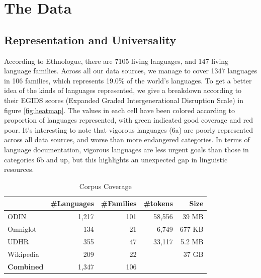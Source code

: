 \section{The Data}\label{sec:data}

\subsection{Representation and Universality} \label{sec:stats}

According to Ethnologue, there are 7105 living languages, and 147 living language families. Across all our data sources, we manage to cover 1347 languages in 106 families, which represents 19.0\% of the world's languages. To get a better idea of the kinds of languages represented, we give a breakdown according to their EGIDS scores (Expanded Graded Intergenerational Disruption Scale) \cite{lewis2010assessing} in figure \ref{fig:heatmap}. The values in each cell have been colored according to proportion of languages represented, with green indicated good coverage and red poor. It's interesting to note that vigorous languages (6a) are poorly represented across all data sources, and worse than more endangered categories. In terms of language documentation, vigorous languages are less urgent goals than those in categories 6b and up, but this highlights an unexpected gap in linguistic resources.


\begin{table}[h!]
\small
\centering
    \begin{tabular}{l|rr|rr}
    ~         				& \#Languages & \#Families 	&\#tokens		& Size	\\ \hline
    ODIN      				& 1,217      & 101       		& 58,556		& 39 MB		\\
    Omniglot  				& 134        & 21        		&	6,749			& 677 KB	\\
    UDHR      				& 355        & 47        		&	33,117		& 5.2 MB	\\
    Wikipedia 				& 209        & 22       		&						& 37 GB		\\ \hline
    \textbf{Combined}	& 1,347			 & 106 
    \end{tabular}
\caption{Corpus Coverage}
\label{table:corpus}
\end{table}

